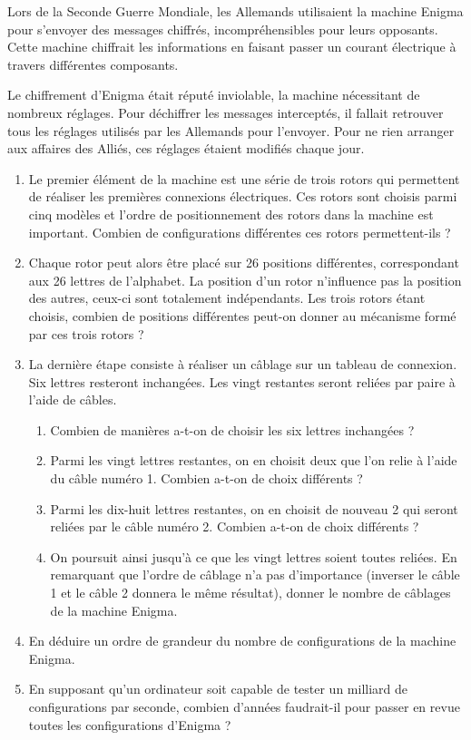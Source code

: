 \documentclass[11pt,fleqn, openany]{book} %
\begin{document}
\begin{exercise}Lors de la Seconde Guerre Mondiale, les Allemands utilisaient la machine Enigma pour s'envoyer des messages chiffrés, incompréhensibles pour leurs opposants. Cette machine chiffrait les informations en faisant passer un courant électrique à travers différentes composants. 

Le chiffrement d'Enigma était réputé inviolable, la machine nécessitant de nombreux réglages. Pour déchiffrer les messages interceptés, il fallait retrouver tous les réglages utilisés par les Allemands pour l'envoyer. Pour ne rien arranger aux affaires des Alliés, ces réglages étaient modifiés chaque jour.

\begin{enumerate}
\item Le premier élément de la machine est une série de trois rotors qui permettent de réaliser les premières connexions électriques. Ces rotors sont choisis parmi cinq modèles et l'ordre de positionnement des rotors dans la machine est important. Combien de configurations différentes ces rotors permettent-ils ?
\item Chaque rotor peut alors être placé sur 26 positions différentes, correspondant aux 26 lettres de l'alphabet. La position d'un rotor n'influence pas la position des autres, ceux-ci sont totalement indépendants. Les trois rotors étant choisis, combien de positions différentes peut-on donner au mécanisme formé par ces trois rotors ?
\item La dernière étape consiste à réaliser un câblage sur un tableau de connexion. Six lettres resteront inchangées. Les vingt restantes seront reliées par paire à l'aide de câbles.
\begin{enumerate}
\item Combien de manières a-t-on de choisir les six lettres inchangées ?
\item Parmi les vingt lettres restantes, on en choisit deux que l'on relie à l'aide du câble numéro 1. Combien a-t-on de choix différents ?
\item Parmi les dix-huit lettres restantes, on en choisit de nouveau 2 qui seront reliées par le câble numéro 2. Combien a-t-on de choix différents ?
\item On poursuit ainsi jusqu'à ce que les vingt lettres soient toutes reliées. En remarquant que l'ordre de câblage n'a pas d'importance (inverser le câble 1 et le câble 2 donnera le même résultat), donner le nombre de câblages de la machine Enigma.
\end{enumerate}
\item En déduire un ordre de grandeur du nombre de configurations de la machine Enigma.
\item En supposant qu'un ordinateur soit capable de tester un milliard de configurations par seconde, combien d'années faudrait-il pour passer en revue toutes les configurations d'Enigma ?
\end{enumerate}\end{exercise}
\end{document}

